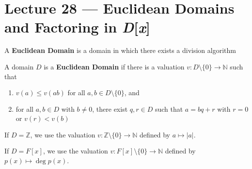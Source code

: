 \section{Lecture 28 — Euclidean Domains and Factoring in \textit{D}[\textit{x}]}

A \textbf{Euclidean Domain} is a domain in which there exists a division algorithm

\begin{definition}
	A domain $D$ is a \textbf{Euclidean Domain} if there is a valuation $v\colon D\setminus\{0\}\to\mathbb N$ such that
	\begin{enumerate}
		\item $v(a)\leq v(ab)$ for all $a,b\in D\setminus\{0\}$, and
		\item for all $a,b\in D$ with $b\neq 0$, there exist $q,r\in D$ such that $a=bq+r$ with $r=0$ or $v(r)<v(b)$ 
	\end{enumerate}
\end{definition}

\begin{example}
	If $D=\mathbb Z$, we use the valuation $v\colon \mathbb Z\setminus\{0\}\to\mathbb N$ defined by $a\mapsto |a|$.

	If $D=F[x]$, we use the valuation $v\colon F[x]\setminus\{0\}\to\mathbb N$ defined by $p(x)\mapsto\deg p(x)$.
\end{example}

